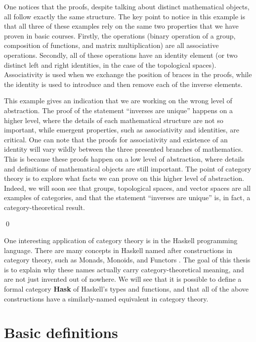 \documentclass[../thesis.tex]{subfiles}
\begin{document}
\begin{ex}
One notices that the proofs, despite talking about distinct mathematical objects, all follow exactly the same structure.
The key point to notice in this example is that all three of these examples rely on the same two properties that we have proven in basic courses.
Firstly, the operations (binary operation of a group, composition of functions, and matrix multiplication) are all associative operations.
Secondly, all of these operations have an identity element (or two distinct left and right identities, in the case of the topological spaces). 
Associativity is used when we exchange the position of braces in the proofs, while the identity is used to introduce and then remove each of the inverse elements.

This example gives an indication that we are working on the wrong level of abstraction.
The proof of the statement ``inverses are unique'' happens on a higher level, where the details of each mathematical structure are not so important, while emergent properties, such as associativity and identities, are critical.
One can note that the proofs for associativity and existence of an identity will vary wildly between the three presented branches of mathematics.
This is because these proofs happen on a low level of abstraction, where details and definitions of mathematical objects are still important.
The point of category theory is to explore what facts we can prove on this higher level of abstraction.
Indeed, we will soon see that groups, topological spaces, and vector spaces are all examples of categories, and that the statement ``inverses are unique'' is, in fact, a category-theoretical result.

\qed
\end{ex}

One interesting application of category theory is in the Haskell programming language.
There are many concepts in Haskell named after constructions in category theory, such as Monads, Monoids, and Functors \cite{haskmooc}.
The goal of this thesis is to explain why these names actually carry category-theoretical meaning, and are not just invented out of nowhere.
We will see that it is possible to define a formal category \textbf{Hask} of Haskell's types and functions, and that all of the above constructions have a similarly-named equivalent in category theory.

\section{Basic definitions}
\end{document}
